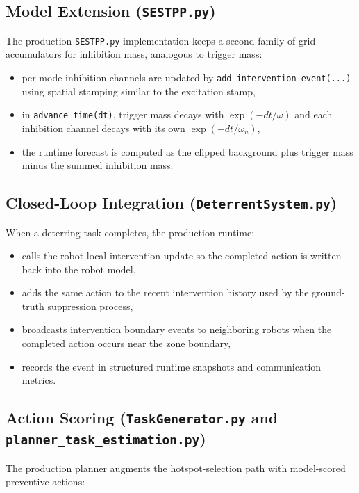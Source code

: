 \subsection{Model Extension (\texttt{SESTPP.py})}

The production \texttt{SESTPP.py} implementation keeps a second family of grid accumulators for inhibition mass, analogous to trigger mass:

\begin{itemize}
\item per-mode inhibition channels are updated by \texttt{add\_intervention\_event(...)} using spatial stamping similar to the excitation stamp,
\item in \texttt{advance\_time(dt)}, trigger mass decays with $\exp(-dt/\omega)$ and each inhibition channel decays with its own $\exp(-dt/\omega_u)$,
\item the runtime forecast is computed as the clipped background plus trigger mass minus the summed inhibition mass.
\end{itemize}

\subsection{Closed-Loop Integration (\texttt{DeterrentSystem.py})}

When a deterring task completes, the production runtime:

\begin{itemize}
\item calls the robot-local intervention update so the completed action is written back into the robot model,
\item adds the same action to the recent intervention history used by the ground-truth suppression process,
\item broadcasts intervention boundary events to neighboring robots when the completed action occurs near the zone boundary,
\item records the event in structured runtime snapshots and communication metrics.
\end{itemize}

\subsection{Action Scoring (\texttt{TaskGenerator.py} and \texttt{planner\_task\_estimation.py})}

The production planner augments the hotspot-selection path with model-scored preventive actions:

